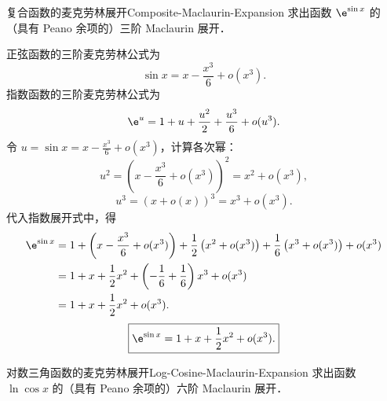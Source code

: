 \begin{problem}{复合函数的麦克劳林展开}{Composite-Maclaurin-Expansion}
    求出函数 $\e^{\sin x}$ 的（具有 Peano 余项的）三阶 Maclaurin 展开．
\end{problem}

\begin{solution}
    正弦函数的三阶麦克劳林公式为
    \begin{equation}
        \sin x = x - \frac{x^3}{6} + o(x^3).
    \end{equation}
    指数函数的三阶麦克劳林公式为
    \begin{equation}
        \e^u = 1 + u + \frac{u^2}{2} + \frac{u^3}{6} + o(u^3).
    \end{equation}
    令 $u = \sin x = x - \frac{x^3}{6} + o(x^3)$，计算各次幂：
    \begin{equation}
        u^2 = \left( x - \frac{x^3}{6} + o(x^3) \right)^2 = x^2 + o(x^3),
    \end{equation}
    \begin{equation}
        u^3 = \left( x + o(x) \right)^3 = x^3 + o(x^3).
    \end{equation}
    代入指数展开式中，得
    \begin{equation}
        \begin{aligned}
            \e^{\sin x} & = 1 + \left( x - \frac{x^3}{6} + o(x^3) \right) + \frac{1}{2}\left( x^2 + o(x^3) \right) + \frac{1}{6}\left( x^3 + o(x^3) \right) + o(x^3) \\
                        & = 1 + x + \frac{1}{2}x^2 + \left( -\frac{1}{6} + \frac{1}{6} \right)x^3 + o(x^3)                                                           \\
                        & = 1 + x + \frac{1}{2}x^2 + o(x^3).
        \end{aligned}
    \end{equation}
    \begin{equation}
        \boxed{\e^{\sin x} = 1 + x + \frac{1}{2}x^2 + o(x^3).}
    \end{equation}
\end{solution}

\begin{problem}{对数三角函数的麦克劳林展开}{Log-Cosine-Maclaurin-Expansion}
    求出函数 $\ln\cos x$ 的（具有 Peano 余项的）六阶 Maclaurin 展开．
\end{problem}

